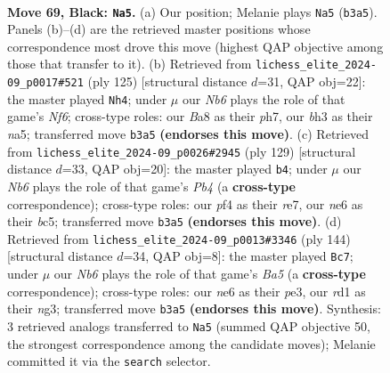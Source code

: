 \documentclass[11pt]{article}
\begin{document}
\clearpage

\begin{figure}[p]\centering
\begin{subfigure}{0.46\textwidth}\centering
\resizebox{\linewidth}{!}{%
\newchessgame
\chessboard[
  setfen={b7/P7/4Nk2/8/1p3P2/1n4PB/4K2P/3R4 b - - 7 69},
  showmover=false,
  pgfstyle=straightmove, color=movearrow, markmove={b3-a5}
]}
\caption{}
\end{subfigure}\hfill
\begin{subfigure}{0.46\textwidth}\centering
\resizebox{\linewidth}{!}{%
\newchessgame
\chessboard[
  setfen={6K1/7P/2N3P1/NP1k4/5p2/5n2/1b6/8 b - - 0 63},
  showmover=false,
  pgfstyle=straightmove, color=movearrow, markmove={f3-h4}
]}
\caption{}
\end{subfigure}
\\[4pt]
\begin{subfigure}{0.46\textwidth}\centering
\resizebox{\linewidth}{!}{%
\newchessgame
\chessboard[
  setfen={8/4R3/2k5/1pB2P1b/3P4/1P2K3/P7/8 b - - 4 65},
  showmover=false,
  pgfstyle=straightmove, color=movearrow, markmove={b5-b4}
]}
\caption{}
\end{subfigure}\hfill
\begin{subfigure}{0.46\textwidth}\centering
\resizebox{\linewidth}{!}{%
\newchessgame
\chessboard[
  setfen={8/8/6p1/B6p/3K1p1P/4p1n1/6k1/8 w - - 2 73},
  showmover=false,
  pgfstyle=straightmove, color=movearrow, markmove={a5-c7}
]}
\caption{}
\end{subfigure}
\caption{\textbf{Move 69, Black: \texttt{Na5}.} (a) Our position; Melanie plays \texttt{Na5} (\texttt{b3a5}). Panels (b)--(d) are the retrieved master positions whose correspondence most drove this move (highest QAP objective among those that transfer to it). (b) Retrieved from \texttt{lichess\_elite\_2024-09\_p0017\#521} (ply 125) [structural distance $d$=31, QAP obj=22]: the master played \texttt{Nh4}; under $\mu$ our \emph{Nb6} plays the role of that game's \emph{Nf6}; cross-type roles: our \emph{B}a8 as their \emph{p}h7, our \emph{b}h3 as their \emph{n}a5; transferred move \texttt{b3a5} \textbf{(endorses this move)}. (c) Retrieved from \texttt{lichess\_elite\_2024-09\_p0026\#2945} (ply 129) [structural distance $d$=33, QAP obj=20]: the master played \texttt{b4}; under $\mu$ our \emph{Nb6} plays the role of that game's \emph{Pb4} (a \textbf{cross-type} correspondence); cross-type roles: our \emph{p}f4 as their \emph{r}e7, our \emph{n}e6 as their \emph{b}c5; transferred move \texttt{b3a5} \textbf{(endorses this move)}. (d) Retrieved from \texttt{lichess\_elite\_2024-09\_p0013\#3346} (ply 144) [structural distance $d$=34, QAP obj=8]: the master played \texttt{Bc7}; under $\mu$ our \emph{Nb6} plays the role of that game's \emph{Ba5} (a \textbf{cross-type} correspondence); cross-type roles: our \emph{n}e6 as their \emph{p}e3, our \emph{r}d1 as their \emph{n}g3; transferred move \texttt{b3a5} \textbf{(endorses this move)}. Synthesis: 3 retrieved analogs transferred to \texttt{Na5} (summed QAP objective 50, the strongest correspondence among the candidate moves); Melanie committed it via the \texttt{search} selector.}
\label{fig:thought-m137}
\end{figure}
\end{document}
